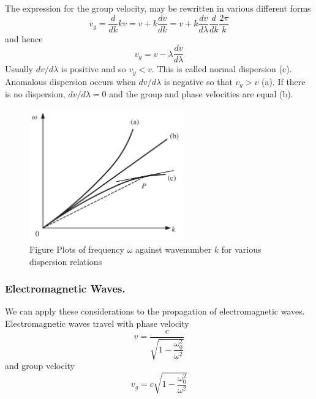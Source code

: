 \documentclass[../../../main.tex]{subfiles}
\begin{document}
The expression for the group velocity, may be rewritten in various different forms
\begin{equation*}
    v_g=\frac{d}{dk}kv=v+k\frac{dv}{dk}=v+k\frac{dv}{d\lambda}\frac{d}{dk} \frac{2\pi}{k}
\end{equation*}
and hence
\begin{equation*}
    v_g=v-\lambda\frac{dv}{d\lambda}
\end{equation*}
Usually $dv/d\lambda$ is positive and so $v_g < v$. This is called normal dispersion (c). Anomalous dispersion occurs when $dv/d\lambda$ is negative so that $v_g > v$ (a). If there is no dispersion, $dv/d\lambda = 0$ and the group and phase velocities are equal (b).
\begin{figure}
    \centering
    \includegraphics[width=0.6\textwidth]{../Rss/Waves/Dispersion/DispRel.png}
    \caption*{Figure Plots of frequency $\omega$ against wavenumber $k$ for various dispersion relations}
\end{figure}

\subsubsection*{Electromagnetic Waves.} We can apply these considerations to the propagation of electromagnetic waves. Electromagnetic waves travel with phase velocity 
\begin{equation*}
    v=\frac{c}{\sqrt{1-\dfrac{\omega_0^2}{\omega^2}}}
\end{equation*}
and group velocity
\begin{equation*}
    v_g=c \sqrt{1-\frac{\omega_0^2}{\omega^2}}
\end{equation*}
\end{document}
